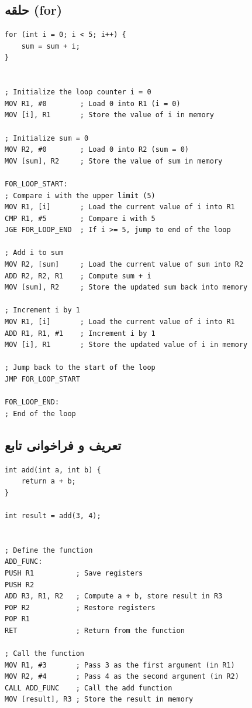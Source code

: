 \documentclass{article}
\begin{document}
\subsection*{حلقه (for)}
\begin{LTR} %
\begin{lstlisting}
for (int i = 0; i < 5; i++) {
    sum = sum + i;
}


; Initialize the loop counter i = 0
MOV R1, #0        ; Load 0 into R1 (i = 0)
MOV [i], R1       ; Store the value of i in memory

; Initialize sum = 0
MOV R2, #0        ; Load 0 into R2 (sum = 0)
MOV [sum], R2     ; Store the value of sum in memory

FOR_LOOP_START:
; Compare i with the upper limit (5)
MOV R1, [i]       ; Load the current value of i into R1
CMP R1, #5        ; Compare i with 5
JGE FOR_LOOP_END  ; If i >= 5, jump to end of the loop

; Add i to sum
MOV R2, [sum]     ; Load the current value of sum into R2
ADD R2, R2, R1    ; Compute sum + i
MOV [sum], R2     ; Store the updated sum back into memory

; Increment i by 1
MOV R1, [i]       ; Load the current value of i into R1
ADD R1, R1, #1    ; Increment i by 1
MOV [i], R1       ; Store the updated value of i in memory

; Jump back to the start of the loop
JMP FOR_LOOP_START

FOR_LOOP_END:
; End of the loop
\end{lstlisting}
\end{LTR}


\subsection*{تعریف و فراخوانی تابع}
\begin{LTR} %
\begin{lstlisting}
int add(int a, int b) {
    return a + b;
}

int result = add(3, 4);


; Define the function
ADD_FUNC:
PUSH R1          ; Save registers
PUSH R2
ADD R3, R1, R2   ; Compute a + b, store result in R3
POP R2           ; Restore registers
POP R1
RET              ; Return from the function

; Call the function
MOV R1, #3       ; Pass 3 as the first argument (in R1)
MOV R2, #4       ; Pass 4 as the second argument (in R2)
CALL ADD_FUNC    ; Call the add function
MOV [result], R3 ; Store the result in memory
\end{lstlisting}
\end{LTR}
\end{document}
